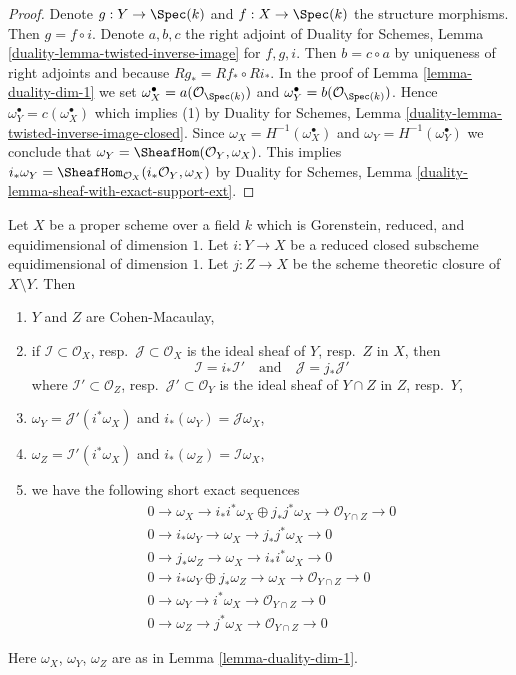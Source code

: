 \begin{proof}
Denote $g : Y \to \Spec(k)$ and $f : X \to \Spec(k)$ the structure morphisms.
Then $g = f \circ i$. Denote $a, b, c$ the right adjoint of
Duality for Schemes, Lemma
\ref{duality-lemma-twisted-inverse-image} for $f, g, i$.
Then $b = c \circ a$ by uniqueness of right adjoints
and because $Rg_* = Rf_* \circ Ri_*$.
In the proof of Lemma \ref{lemma-duality-dim-1}
we set
$\omega_X^\bullet = a(\mathcal{O}_{\Spec(k)})$ and
$\omega_Y^\bullet = b(\mathcal{O}_{\Spec(k)})$.
Hence $\omega_Y^\bullet = c(\omega_X^\bullet)$
which implies (1) by Duality for Schemes, Lemma
\ref{duality-lemma-twisted-inverse-image-closed}.
Since $\omega_X = H^{-1}(\omega_X^\bullet)$ and
$\omega_Y = H^{-1}(\omega_Y^\bullet)$ we conclude that
$\omega_Y = \SheafHom(\mathcal{O}_Y, \omega_X)$.
This implies
$i_*\omega_Y = \SheafHom_{\mathcal{O}_X}(i_*\mathcal{O}_Y, \omega_X)$
by Duality for Schemes, Lemma
\ref{duality-lemma-sheaf-with-exact-support-ext}.
\end{proof}

\begin{lemma}
\label{lemma-closed-subscheme-reduced-gorenstein}
Let $X$ be a proper scheme over a field $k$ which is
Gorenstein, reduced, and equidimensional of dimension $1$.
Let $i : Y \to X$ be a reduced closed subscheme equidimensional
of dimension $1$. Let $j : Z \to X$ be the scheme theoretic
closure of $X \setminus Y$. Then
\begin{enumerate}
\item $Y$ and $Z$ are Cohen-Macaulay,
\item if $\mathcal{I} \subset \mathcal{O}_X$,
resp.\ $\mathcal{J} \subset \mathcal{O}_X$ is the ideal sheaf of
$Y$, resp.\ $Z$ in $X$, then
$$
\mathcal{I} = i_*\mathcal{I}'
\quad\text{and}\quad
\mathcal{J} = j_*\mathcal{J}'
$$
where $\mathcal{I}' \subset \mathcal{O}_Z$,
resp.\ $\mathcal{J}' \subset \mathcal{O}_Y$ is the ideal sheaf
of $Y \cap Z$ in $Z$, resp.\ $Y$,
\item $\omega_Y = \mathcal{J}'(i^*\omega_X)$ and
$i_*(\omega_Y) = \mathcal{J}\omega_X$,
\item $\omega_Z = \mathcal{I}'(i^*\omega_X)$ and
$i_*(\omega_Z) = \mathcal{I}\omega_X$,
\item we have the following short exact sequences
\begin{align*}
0 \to \omega_X \to i_*i^*\omega_X \oplus j_*j^*\omega_X \to
\mathcal{O}_{Y \cap Z} \to 0 \\
0 \to i_*\omega_Y \to \omega_X \to j_*j^*\omega_X \to 0 \\
0 \to j_*\omega_Z \to \omega_X \to i_*i^*\omega_X \to 0 \\
0 \to i_*\omega_Y \oplus j_*\omega_Z \to \omega_X \to
\mathcal{O}_{Y \cap Z} \to 0 \\
0 \to \omega_Y \to i^*\omega_X \to \mathcal{O}_{Y \cap Z} \to 0 \\
0 \to \omega_Z \to j^*\omega_X \to \mathcal{O}_{Y \cap Z} \to 0
\end{align*}
\end{enumerate}
Here $\omega_X$, $\omega_Y$, $\omega_Z$ are as in
Lemma \ref{lemma-duality-dim-1}.
\end{lemma}

